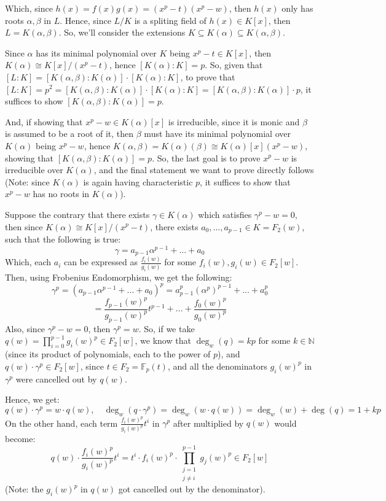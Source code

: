 \documentclass{article}
\begin{document}
\begin{itemize}
    Which, since $h(x)=f(x)g(x)=(x^p-t)(x^p-w)$, then $h(x)$ only has roots $\alpha,\beta$ in $L$. Hence, since $L/K$ is a spliting field of $h(x)\in K[x]$, then $L=K(\alpha,\beta)$. So, we'll consider the extensions $K\subseteq K(\alpha)\subseteq K(\alpha,\beta)$.

    \hfil

    Since $\alpha$ has its minimal polynomial over $K$ being $x^p-t\in K[x]$, then $K(\alpha)\cong K[x]/(x^p-t)$, hence $[K(\alpha):K]=p$.
    So, given that $[L:K]=[K(\alpha,\beta):K(\alpha)]\cdot [K(\alpha):K]$, to prove that $[L:K]=p^2 = [K(\alpha,\beta):K(\alpha)]\cdot [K(\alpha):K] = [K(\alpha,\beta):K(\alpha)]\cdot p$, it suffices to show $[K(\alpha,\beta):K(\alpha)] = p$. 
    
    And, if showing that $x^p-w\in K(\alpha)[x]$ is irreducible, since it is monic and $\beta$ is assumed to be a root of it, then $\beta$ must have its minimal polynomial over $K(\alpha)$ being $x^p-w$, hence $K(\alpha,\beta) = K(\alpha)(\beta)\cong K(\alpha)[x](x^p-w)$, showing that $[K(\alpha,\beta):K(\alpha)]=p$. So, the last goal is to prove $x^p-w$ is irreducible over $K(\alpha)$, and the final statement we want to prove directly follows (Note: since $K(\alpha)$ is again having characteristic $p$, it suffices to show that $x^p-w$ has no roots in $K(\alpha)$).

    \hfil

    Suppose the contrary that there exists $\gamma\in K(\alpha)$ which satisfies $\gamma^p-w = 0$, then since $K(\alpha)\cong K[x]/(x^p-t)$, there exists $a_0,...,a_{p-1}\in K = F_2(w)$, such that the following is true:
    $$\gamma = a_{p-1}\alpha^{p-1}+...+a_0$$
    Which, each $a_i$ can be expressed as $\frac{f_i(w)}{g_i(w)}$ for some $f_i(w), g_i(w)\in F_2[w]$. Then, using Frobenius Endomorphism, we get the following:
    $$\gamma^p = (a_{p-1}\alpha^{p-1}+...+a_0)^p = a_{p-1}^p(\alpha^p)^{p-1} + ... + a_0^p$$
    $$ = \frac{f_{p-1}(w)^p}{g_{p-1}(w)^p}t^{p-1}+...+\frac{f_0(w)^p}{g_0(w)^p}$$
    Also, since $\gamma^p-w = 0$, then $\gamma^p=w$. So, if we take $q(w) = \prod_{i=0}^{p-1}g_i(w)^p\in F_2[w]$, we know that $\deg_w(q) = kp$ for some $k\in \mathbb{N}$ (since its product of polynomials, each to the power of $p$), and $q(w)\cdot \gamma^p\in F_2[w]$, since $t\in F_2=\mathbb{F}_p(t)$, and all the denominators $g_i(w)^p$ in $\gamma^p$ were cancelled out by $q(w)$.
    
    Hence, we get:
    $$q(w)\cdot \gamma^p = w \cdot q(w),\quad \deg_w(q\cdot \gamma^p) = \deg_w(w\cdot q(w)) =\deg_w(w)+\deg(q)= 1+kp$$
    On the other hand, each term $\frac{f_i(w)^p}{g_i(w)^p}t^i$ in $\gamma^p$ after multiplied by $q(w)$ would become:
    $$q(w)\cdot \frac{f_i(w)^p}{g_i(w)^p}t^i = t^i\cdot f_i(w)^p\cdot \prod_{\substack{j=1\\j\neq i}}^{p-1}g_j(w)^p\in F_2[w]$$
    (Note: the $g_i(w)^p$ in $q(w)$ got cancelled out by the denominator).


\end{itemize}
\end{document}
